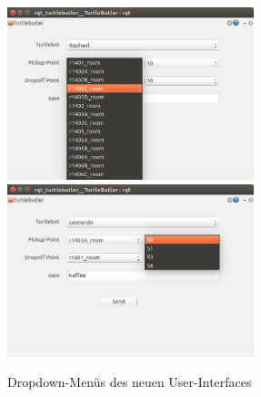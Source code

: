 \documentclass[a4paper,12pt,headsepline]{scrartcl}
\begin{document}
		\begin{figure} [H]
			\centering
			\includegraphics[height=5cm]{Images/Turtlebutler_Rooms.png}
			\includegraphics[height=5cm]{Images/Turtlebutler_Positions.png}
			\caption{Dropdown-Menüs des neuen User-Interfaces}
			\label{fig:NewUIDropdown}
		\end{figure}
	
			
\end{document}
